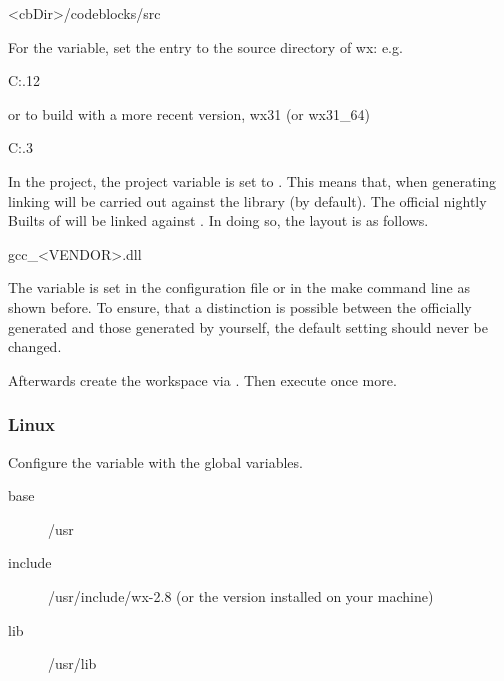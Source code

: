 \begin{cmd}
<cbDir>/codeblocks/src
\end{cmd}


For the  variable, set the  entry to the source directory of wx: e.g.

\begin{cmd}
C:.12
\end{cmd}

or to build with a more recent version, wx31 (or wx31\_64)

\begin{cmd}
C:.3
\end{cmd}

In the \codeblocks project, the project variable  is set to . This means that, when generating \codeblocks linking will be carried out against the  library (by default). The official nightly Builts of \codeblocks will be linked against . In doing so, the layout is as follows.

\begin{code}
gcc_<VENDOR>.dll
\end{code}

The  variable is set in the configuration file  or in the make command line as shown before. To ensure, that a distinction is possible between the officially generated \codeblocks and those generated by yourself, the default setting  should never be changed.

Afterwards create the workspace  via . Then execute  once more.

\subsubsection{Linux}

Configure the  variable with the global variables.

\begin{description}
\item[base] /usr
\item[include] /usr/include/wx-2.8 (or the version installed on your machine)
\item[lib] /usr/lib
\end{description}


